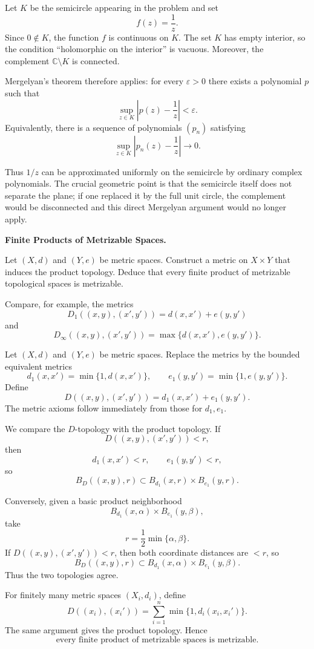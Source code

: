 \begin{solution}
Let \(K\) be the semicircle appearing in the problem and set
\[
f(z)=\frac1z.
\]
Since \(0\notin K\), the function \(f\) is continuous on \(K\). The set \(K\) has
empty interior, so the condition ``holomorphic on the interior'' is vacuous.
Moreover, the complement \(\mathbb C\setminus K\) is connected.

Mergelyan's theorem therefore applies: for every \(\varepsilon>0\) there exists a
polynomial \(p\) such that
\[
\sup_{z\in K}\left|p(z)-\frac1z\right|<\varepsilon.
\]
Equivalently, there is a sequence of polynomials \((p_n)\) satisfying
\[
\boxed{
\sup_{z\in K}\left|p_n(z)-\frac1z\right|\longrightarrow0.
}
\]

Thus \(1/z\) can be approximated uniformly on the semicircle by ordinary complex
polynomials. The crucial geometric point is that the semicircle itself does not
separate the plane; if one replaced it by the full unit circle, the complement
would be disconnected and this direct Mergelyan argument would no longer apply.
\end{solution}

\begin{problem}[CP-II-0411]
\label{prob:cp-ii-0411}
\textbf{Finite Products of Metrizable Spaces.}

\hspace*{1.5em}Let \((X,d)\) and \((Y,e)\) be metric spaces. Construct a metric on
\(X\times Y\) that induces the product topology. Deduce that every finite
product of metrizable topological spaces is metrizable.

Compare, for example, the metrics
\[
D_1((x,y),(x',y'))=d(x,x')+e(y,y')
\]
and
\[
D_\infty((x,y),(x',y'))=\max\{d(x,x'),e(y,y')\}.
\]
\end{problem}

\begin{solution}
Let \((X,d)\) and \((Y,e)\) be metric spaces. Replace the metrics by the bounded equivalent
metrics
\[
d_1(x,x')=\min\{1,d(x,x')\},
\qquad
e_1(y,y')=\min\{1,e(y,y')\}.
\]
Define
\[
D((x,y),(x',y'))
=
d_1(x,x')+e_1(y,y').
\]
The metric axioms follow immediately from those for \(d_1,e_1\).

We compare the \(D\)-topology with the product topology. If
\[
D((x,y),(x',y'))<r,
\]
then
\[
d_1(x,x')<r,
\qquad
e_1(y,y')<r,
\]
so
\[
B_D((x,y),r)
\subset
B_{d_1}(x,r)\times B_{e_1}(y,r).
\]

Conversely, given a basic product neighborhood
\[
B_{d_1}(x,\alpha)\times B_{e_1}(y,\beta),
\]
take
\[
r=\frac12\min\{\alpha,\beta\}.
\]
If \(D((x,y),(x',y'))<r\), then both coordinate distances are \(<r\), so
\[
B_D((x,y),r)
\subset
B_{d_1}(x,\alpha)\times B_{e_1}(y,\beta).
\]
Thus the two topologies agree.

For finitely many metric spaces \((X_i,d_i)\), define
\[
D((x_i),(x_i'))
=
\sum_{i=1}^n
\min\{1,d_i(x_i,x_i')\}.
\]
The same argument gives the product topology. Hence
\[
\boxed{\text{every finite product of metrizable spaces is metrizable}.}
\]
\end{solution}



